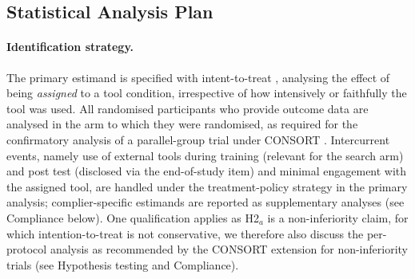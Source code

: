 
\subsection{Statistical Analysis Plan}
\label{sec:sap}

\paragraph{Identification strategy.}
The primary estimand is specified with intent-to-treat \parencite{ich1998}, analysing the effect of being \emph{assigned} to a tool condition, irrespective of how intensively or faithfully the tool was used. All randomised participants who provide outcome data are analysed in the arm to which they were randomised,
as required for the confirmatory analysis of a parallel-group trial under CONSORT \parencite{hopewell2025}. %
Intercurrent events, namely use of external tools during training (relevant for the search arm) and post test (disclosed via the end-of-study item) and 
minimal engagement with the assigned tool, are handled under the 
treatment-policy strategy in the primary analysis; 
complier-specific estimands are reported as supplementary analyses (see Compliance below). 
One qualification applies as H2$_a$ is a non-inferiority claim, for which intention-to-treat is not conservative, we therefore also discuss the per-protocol analysis as recommended by the CONSORT extension for non-inferiority trials \parencite{piaggio2012} (see Hypothesis testing and Compliance).

